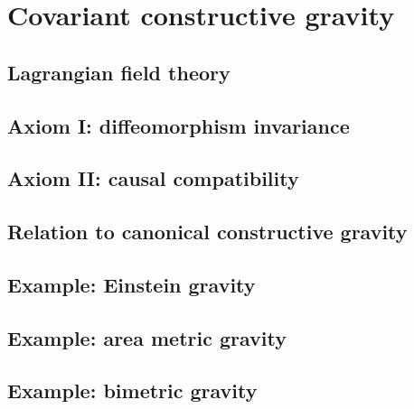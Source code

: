 \chapter{Covariant constructive gravity}

\section{Lagrangian field theory}

\section{Axiom I: diffeomorphism invariance}

\section{Axiom II: causal compatibility}

\section{Relation to canonical constructive gravity}

\section{Example: Einstein gravity}
\section{Example: area metric gravity}
\section{Example: bimetric gravity}

